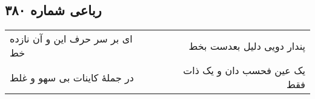 \begin{center}
\section*{رباعی شماره ۳۸۰}
\label{sec:sh380}
\begin{longtable}{l p{0.5cm} r}
ای بر سر حرف این و آن نازده خط
&&
پندار دویی دلیل بعدست بخط
\\
در جملهٔ کاینات بی سهو و غلط
&&
یک عین فحسب دان و یک ذات فقط
\\
\end{longtable}
\end{center}

